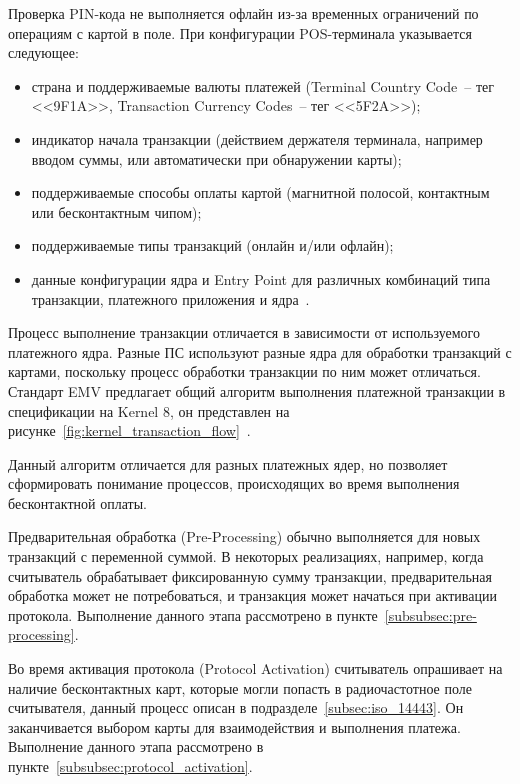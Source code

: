 Проверка PIN-кода не выполняется офлайн из-за временных ограничений по операциям с картой в поле.
При конфигурации POS-терминала указывается следующее:

\begin{itemize}
    \item страна и поддерживаемые валюты платежей (Terminal Country Code~-- тег <<9F1A>>, Transaction Currency Codes~-- тег <<5F2A>>);
    \item индикатор начала транзакции (действием держателя терминала, например вводом суммы, или автоматически при обнаружении карты);
    \item поддерживаемые способы оплаты картой (магнитной полосой, контактным или бесконтактным чипом);
    \item поддерживаемые типы транзакций (онлайн и/или офлайн);
    \item данные конфигурации ядра и Entry Point для различных комбинаций типа транзакции, платежного приложения и ядра~\cite{emv_book_A}.
\end{itemize}

Процесс выполнение транзакции отличается в зависимости от используемого платежного ядра.
Разные ПС используют разные ядра для обработки транзакций с картами, поскольку процесс обработки транзакции по ним может отличаться.
Стандарт EMV предлагает общий алгоритм выполнения платежной транзакции в спецификации на Kernel 8, он представлен на рисунке~\ref{fig:kernel_transaction_flow}~\cite{emv_book_c8}.

Данный алгоритм отличается для разных платежных ядер, но позволяет сформировать понимание процессов, происходящих во время выполнения бесконтактной оплаты.

Предварительная обработка (Pre-Processing) обычно выполняется для новых транзакций с переменной суммой.
В некоторых реализациях, например, когда считыватель обрабатывает фиксированную сумму транзакции, предварительная обработка может не потребоваться, и транзакция может начаться при активации протокола.
Выполнение данного этапа рассмотрено в пункте~\ref{subsubsec:pre-processing}.

Во время активация протокола (Protocol Activation) считыватель опрашивает на наличие бесконтактных карт, которые могли попасть в радиочастотное поле считывателя, данный процесс описан в подразделе~\ref{subsec:iso_14443}.
Он заканчивается выбором карты для взаимодействия и выполнения платежа.
Выполнение данного этапа рассмотрено в пункте~\ref{subsubsec:protocol_activation}.

